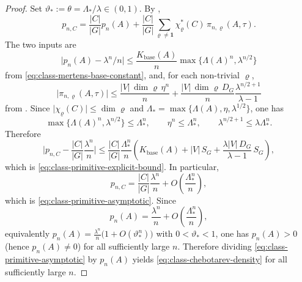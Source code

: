 \documentclass[11pt,a4paper]{amsart}
\theoremstyle{plain}
\theoremstyle{definition}
\theoremstyle{remark}
\newcommand{\abs}[1]{\lvert #1 \rvert}
\begin{document}
\begin{proof}
  Set \(\vartheta_*:=\theta=\Lambda_*/\lambda\in(0,1)\). By
  ,
  \[
    p_{n,C}
    =
    \frac{|C|}{|G|}p_n(A)
    +\frac{|C|}{|G|}
      \sum_{\varrho\neq\mathbf 1}
        \chi_\varrho^\ast(C)\,\pi_{n,\varrho}(A,\tau).
  \]
  The two inputs are
  \[
    \abs{p_n(A)-\lambda^n/n}
    \le
    \frac{K_{\mathrm{base}}(A)}{n}\max\{\Lambda(A)^n,\lambda^{n/2}\}
  \]
  from \eqref{eq:class-mertens-base-constant}, and, for each
  non-trivial \(\varrho\),
  \[
    \abs{\pi_{n,\varrho}(A,\tau)}
    \le
    \frac{|V|\,\dim\varrho\,\eta^n}{n}
    +\frac{|V|\,\dim\varrho\,D_G}{n}
      \frac{\lambda^{n/2+1}}{\lambda-1}
  \]
  from . Since
  \(\abs{\chi_\varrho(C)}\le \dim\varrho\) and
  \(\Lambda_*=\max\{\Lambda(A),\eta,\lambda^{1/2}\}\), one has
  \[
    \max\{\Lambda(A)^n,\lambda^{n/2}\}\le \Lambda_*^n,
    \qquad
    \eta^n\le \Lambda_*^n,
    \qquad
    \lambda^{n/2+1}\le \lambda\Lambda_*^n.
  \]
  Therefore
  \[
    \abs{
      p_{n,C}
      -\frac{|C|}{|G|}\frac{\lambda^n}{n}
    }
    \le
    \frac{|C|}{|G|}
    \frac{\Lambda_*^n}{n}
    \left(
      K_{\mathrm{base}}(A)
      +|V|\,S_G
      +\frac{\lambda |V|\,D_G}{\lambda-1}\,S_G
    \right),
  \]
  which is \eqref{eq:class-primitive-explicit-bound}. In particular,
  \[
    p_{n,C}
    =
    \frac{|C|}{|G|}\frac{\lambda^n}{n}
    +O\!\left(\frac{\Lambda_*^n}{n}\right),
  \]
  which is \eqref{eq:class-primitive-asymptotic}.
  Since
  \[
    p_n(A)=\frac{\lambda^n}{n}+O\!\left(\frac{\Lambda_*^n}{n}\right),
  \]
  equivalently
  \(p_n(A)=\frac{\lambda^n}{n}\bigl(1+O(\vartheta_*^n)\bigr)\) with
  \(0<\vartheta_*<1\), one has \(p_n(A)>0\) (hence \(p_n(A)\neq 0\))
  for all sufficiently large \(n\). Therefore
  dividing \eqref{eq:class-primitive-asymptotic} by \(p_n(A)\) yields
  \eqref{eq:class-chebotarev-density} for all sufficiently large \(n\).


\end{proof}
\end{document}
